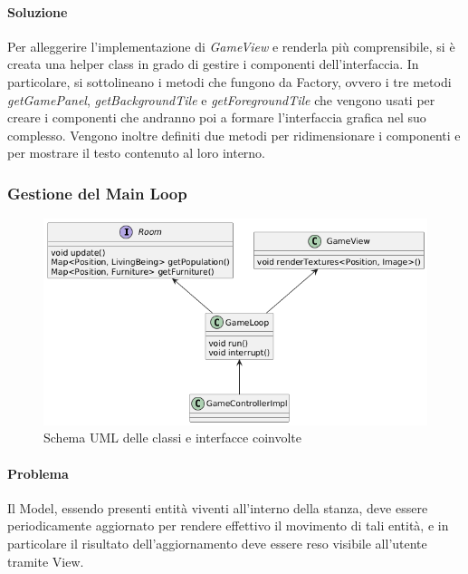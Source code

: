 \documentclass[a4paper,12pt]{report}
\begin{document}
\paragraph{Soluzione} Per alleggerire l'implementazione di \textit{GameView} e renderla più comprensibile, si è creata una helper class in grado di gestire i componenti dell'interfaccia. In particolare, si sottolineano i metodi che fungono da Factory, ovvero i tre metodi \textit{getGamePanel}, \textit{getBackgroundTile} e \textit{getForegroundTile} che vengono usati per creare i componenti che andranno poi a formare l'interfaccia grafica nel suo complesso. Vengono inoltre definiti due metodi per ridimensionare i componenti e per mostrare il testo contenuto al loro interno.

\subsubsection{Gestione del Main Loop}
\begin{figure}[H]
	\centering
	\includegraphics[width=\textwidth]{img/game-loop.png}
	\caption{Schema UML delle classi e interfacce coinvolte}
	\label{img:game-loop}
\end{figure}
\paragraph{Problema} Il Model, essendo presenti entità viventi all'interno della stanza, deve essere periodicamente aggiornato per rendere effettivo il movimento di tali entità, e in particolare il risultato dell'aggiornamento deve essere reso visibile all'utente tramite View.
\end{document}
